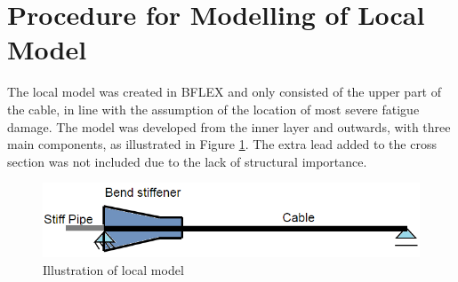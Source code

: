 \section{Procedure for Modelling of Local Model}
\label{sec:localmodel}
The local model was created in BFLEX and only consisted of the upper part of the cable, in line with the assumption of the location of most severe fatigue damage. The model was developed from the inner layer and outwards, with three main components, as illustrated in Figure \ref{fig:localmod}. The extra lead added to the cross section was not included due to the lack of structural importance.
\begin{figure}[H]
\centering
\includegraphics[scale=0.7]{figures/localmod.png}
\caption [$\; \:$Illustration of the local model]{Illustration of local model}
 \label{fig:localmod}
\end{figure}
